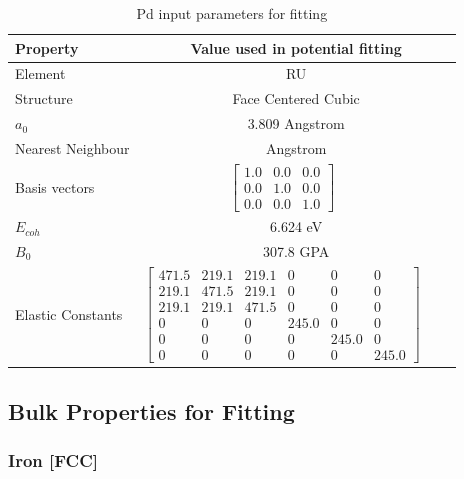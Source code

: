 \begin{table}[ht]
\renewcommand{\arraystretch}{1.2}
\begin{tabular}{lccc}
\hline\hline
Property & \multicolumn{3}{c}{Value used in potential fitting} \\
\hline\hline
Element & \multicolumn{3}{c}{RU}\\
Structure             & \multicolumn{3}{c}{Face Centered Cubic}\\
$a_0$                 & \multicolumn{3}{c}{3.809 Angstrom \cite{webelementspd}}\\
Nearest Neighbour     & \multicolumn{3}{c}{ Angstrom \cite{webelementspd}}\\
Basis vectors         & $\begin{bmatrix} 1.0 & 0.0 & 0.0 \\ 0.0 & 1.0 & 0.0 \\ 0.0 & 0.0 & 1.0  \end{bmatrix}$ \\
$E_{coh}$             & \multicolumn{3}{c}{6.624 eV \cite{semiempiricalpots}}   \\
$B_0$                 & \multicolumn{3}{c}{307.8 GPA \cite{semiempiricalpots}}   \\
Elastic Constants     & $\begin{bmatrix} 471.5 & 219.1 & 219.1 & 0 & 0 & 0 \\ 219.1 & 471.5 & 219.1 & 0 & 0 & 0 \\ 219.1 & 219.1 & 471.5 & 0 & 0 & 0 \\ 0 & 0 & 0 & 245.0 & 0 & 0 \\ 0 & 0 & 0 & 0 & 245.0 & 0 \\ 0 & 0 & 0 & 0 & 0 & 245.0 \end{bmatrix}$ \\
\hline\hline
\end{tabular}
\caption{Pd input parameters for fitting}
\label{table:ruinputparameters}
\end{table}



\subsection{Bulk Properties for Fitting}





\FloatBarrier
\subsubsection{Iron [FCC]}


